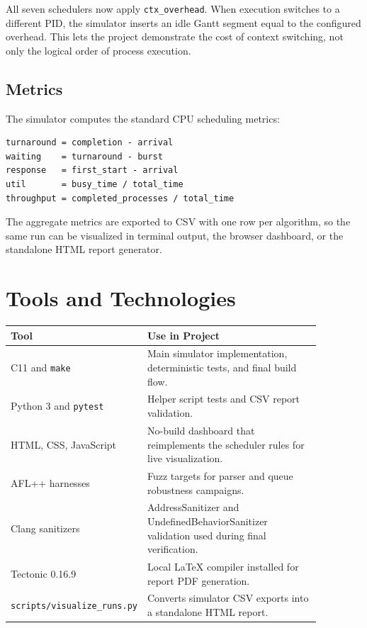 \documentclass[11pt]{article}
\begin{document}
All seven schedulers now apply \texttt{ctx\_overhead}. When execution switches
to a different PID, the simulator inserts an idle Gantt segment equal to the
configured overhead. This lets the project demonstrate the cost of context
switching, not only the logical order of process execution.

\subsection{Metrics}

The simulator computes the standard CPU scheduling metrics:

\begin{lstlisting}[style=code]
turnaround = completion - arrival
waiting    = turnaround - burst
response   = first_start - arrival
util       = busy_time / total_time
throughput = completed_processes / total_time
\end{lstlisting}

The aggregate metrics are exported to CSV with one row per algorithm, so the
same run can be visualized in terminal output, the browser dashboard, or the
standalone HTML report generator.

\section{Tools and Technologies}

\begin{longtable}{p{0.27\linewidth}p{0.60\linewidth}}
\toprule
\textbf{Tool} & \textbf{Use in Project} \\
\midrule
C11 and \texttt{make} & Main simulator implementation, deterministic tests,
and final build flow. \\
Python 3 and \texttt{pytest} & Helper script tests and CSV report validation. \\
HTML, CSS, JavaScript & No-build dashboard that reimplements the scheduler
rules for live visualization. \\
AFL++ harnesses & Fuzz targets for parser and queue robustness campaigns. \\
Clang sanitizers & AddressSanitizer and UndefinedBehaviorSanitizer validation
used during final verification. \\
Tectonic 0.16.9 & Local LaTeX compiler installed for report PDF generation. \\
\texttt{scripts/visualize\_runs.py} & Converts simulator CSV exports into a
standalone HTML report. \\
\bottomrule
\end{longtable}
\end{document}

